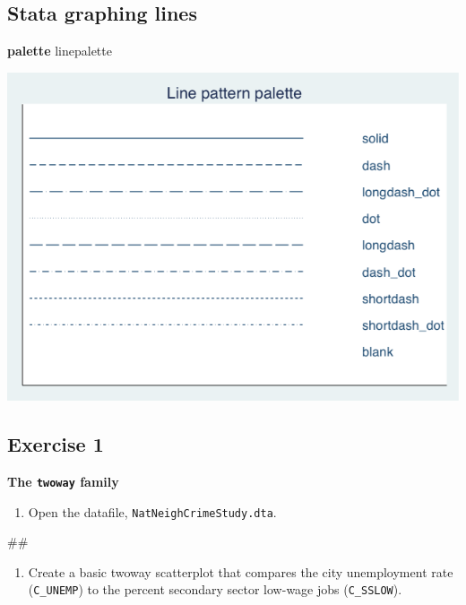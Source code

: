 \documentclass[
]{book}
\newenvironment{Shaded}{\begin{snugshade}}{\end{snugshade}}
\newcommand{\KeywordTok}[1]{\textcolor[rgb]{0.13,0.29,0.53}{\textbf{#1}}}
\newcommand{\NormalTok}[1]{#1}
\providecommand{\tightlist}{%
  \setlength{\itemsep}{0pt}\setlength{\parskip}{0pt}}
\begin{document}
\hypertarget{stata-graphing-lines}{%
\subsection{Stata graphing lines}\label{stata-graphing-lines}}

\begin{Shaded}
\begin{Highlighting}[]
\KeywordTok{palette}\NormalTok{ linepalette}
\end{Highlighting}
\end{Shaded}

\includegraphics{Stata/StataGraphics/images/linepalette.png}

\hypertarget{exercise-1-9}{%
\subsection{Exercise 1}\label{exercise-1-9}}

\textbf{The \texttt{twoway} family}

\begin{enumerate}
\def\labelenumi{\arabic{enumi}.}
\tightlist
\item
  Open the datafile, \texttt{NatNeighCrimeStudy.dta}.
\end{enumerate}

\begin{Shaded}
\begin{Highlighting}[]
\NormalTok{\#\#}
\end{Highlighting}
\end{Shaded}

\begin{enumerate}
\def\labelenumi{\arabic{enumi}.}
\setcounter{enumi}{1}
\tightlist
\item
  Create a basic twoway scatterplot that compares the city unemployment rate (\texttt{C\_UNEMP}) to the percent secondary sector low-wage jobs (\texttt{C\_SSLOW}).
\end{enumerate}
\end{document}
